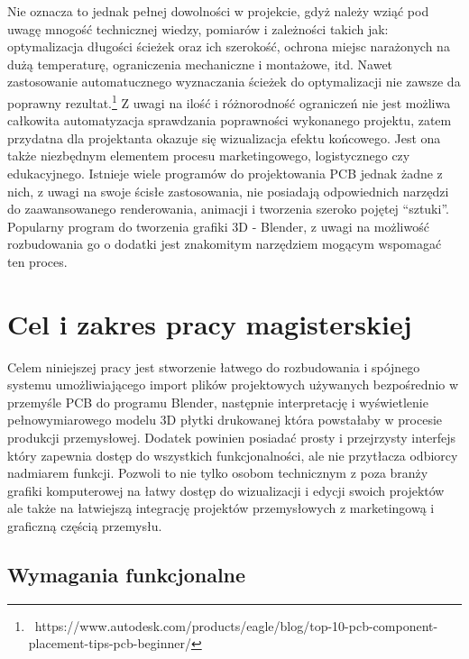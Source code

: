 \documentclass[brudnopis]{xmgr}
\begin{document}
Nie oznacza to jednak pełnej dowolności w projekcie, gdyż należy wziąć pod uwagę mnogość technicznej wiedzy, pomiarów i zależności takich jak: optymalizacja długości ścieżek oraz ich szerokość, ochrona miejsc narażonych na dużą temperaturę, ograniczenia mechaniczne i montażowe, itd. Nawet zastosowanie automatucznego wyznaczania ścieżek do optymalizacji nie zawsze da poprawny rezultat.\footnote{~https://www.autodesk.com/products/eagle/blog/top-10-pcb-component-placement-tips-pcb-beginner/} Z uwagi na ilość i różnorodność ograniczeń nie jest możliwa całkowita automatyzacja sprawdzania poprawności wykonanego projektu, zatem przydatna dla projektanta okazuje się wizualizacja efektu końcowego. Jest ona także niezbędnym elementem procesu marketingowego, logistycznego czy edukacyjnego. Istnieje wiele programów do projektowania PCB jednak żadne z nich, z uwagi na swoje ścisłe zastosowania, nie posiadają odpowiednich narzędzi do zaawansowanego renderowania, animacji i tworzenia szeroko pojętej “sztuki”. Popularny program do tworzenia grafiki 3D - Blender, z uwagi na możliwość rozbudowania go o dodatki jest znakomitym narzędziem mogącym wspomagać ten proces.




\chapter{Cel i zakres pracy magisterskiej}

Celem niniejszej pracy jest stworzenie łatwego do rozbudowania i spójnego systemu umożliwiającego import plików projektowych używanych bezpośrednio w przemyśle PCB do programu Blender, następnie interpretację i wyświetlenie pełnowymiarowego modelu 3D płytki drukowanej która powstałaby w procesie produkcji przemysłowej. Dodatek powinien posiadać prosty i przejrzysty interfejs który zapewnia dostęp do wszystkich funkcjonalności, ale nie przytłacza odbiorcy nadmiarem funkcji. Pozwoli to nie tylko osobom technicznym z poza branży grafiki komputerowej na łatwy dostęp do wizualizacji i edycji swoich projektów ale także na łatwiejszą integrację projektów przemysłowych z marketingową i graficzną częścią przemysłu.

\section{Wymagania funkcjonalne}
\end{document}
